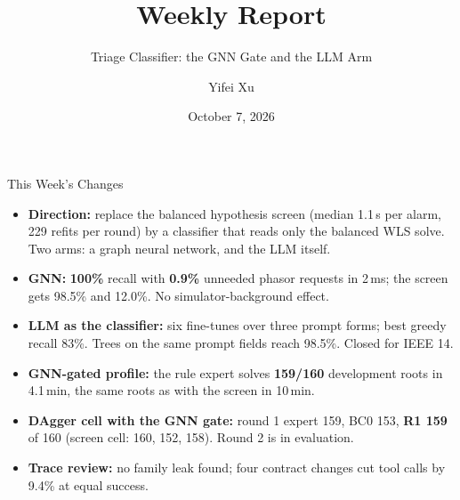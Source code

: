 \documentclass[aspectratio=169]{beamer}
\title[Power System LLM]{Weekly Report}
\subtitle{Triage Classifier: the GNN Gate and the LLM Arm}
\author{Yifei Xu}
\institute{New York University}
\date{October 7, 2026}
\begin{document}
\maketitle

\begin{frame}{This Week's Changes}
  \begin{itemize}
    \setlength\itemsep{0.55em}
    \item \textbf{Direction:} replace the balanced hypothesis screen (median 1.1\,s per alarm, 229 refits per round) by a classifier that reads only the balanced WLS solve. Two arms: a graph neural network, and the LLM itself.
    \item \textbf{GNN:} \textbf{100\%} recall with \textbf{0.9\%} unneeded phasor requests in 2\,ms; the screen gets 98.5\% and 12.0\%. No simulator-background effect.
    \item \textbf{LLM as the classifier:} six fine-tunes over three prompt forms; best greedy recall 83\%. Trees on the same prompt fields reach 98.5\%. Closed for IEEE 14.
    \item \textbf{GNN-gated profile:} the rule expert solves \textbf{159/160} development roots in 4.1\,min, the same roots as with the screen in 10\,min.
    \item \textbf{DAgger cell with the GNN gate:} round 1 expert 159, BC0 153, \textbf{R1 159} of 160 (screen cell: 160, 152, 158). Round 2 is in evaluation.
    \item \textbf{Trace review:} no family leak found; four contract changes cut tool calls by 9.4\% at equal success.
  \end{itemize}
\end{frame}
\end{document}

